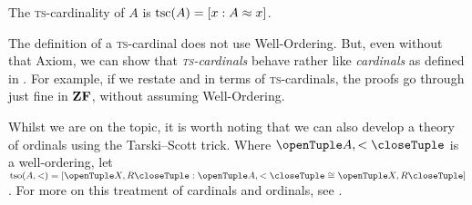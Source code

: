 \documentclass[../../../include/open-logic-section]{subfiles}
\begin{document}
\begin{defn}
The \textsc{ts}-cardinality of $A$ is $\text{tsc}(A) = [x :
A \approx x]$.
\end{defn}

The definition of a \textsc{ts}-cardinal does not use Well-Ordering.
But, even without that Axiom, we can show that
\emph{\textsc{ts}-cardinals} behave rather like \emph{cardinals} as
defined in .
For example, if we restate
 and
 in terms of
\textsc{ts}-cardinals, the proofs go through just fine in $\mathbf{ZF}$,
without assuming Well-Ordering. 

Whilst we are on the topic, it is worth noting that we can also
develop a theory of ordinals using the Tarski--Scott trick. Where
$\tuple{A, <}$ is a well-ordering, let $\text{tso}(A, <) = [\tuple{X,
R} : \ordeq{\tuple{A, <}}{\tuple{X, R}}]$. For more on this treatment
of cardinals and ordinals, see \citet[chs.~9--12]{Potter2004}.
\end{document}
